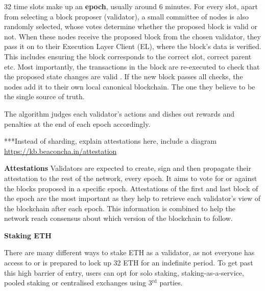 32 time slots make up an \textbf{epoch}, usually around 6 minutes. For every slot, apart from selecting a block proposer (validator), a small committee of nodes is also randomly selected, whose votes determine whether the proposed block is valid or not. When these nodes receive the proposed block from the chosen validator, they pass it on to their Execution Layer Client (EL), where the block's data is verified. This includes ensuring the block corresponds to the correct slot, correct parent etc. Most importantly, the transactions in the block are re-executed to check that the proposed state changes are valid \cite{EthereumEthereum.org}. If the new block passes all checks, the nodes add it to their own local canonical blockchain. The one they believe to be the single source of truth. 

The algorithm judges each validator's actions and dishes out rewards and penalties at the end of each epoch accordingly. 

***Instead of sharding, explain attestations here, include a diagram \url{https://kb.beaconcha.in/attestation}



\textbf{Attestations}
\label{attestationLitRev}
Validators are expected to create, sign and then propagate their attestation to the rest of the network, every epoch. It aims to vote for or against the blocks proposed in a specific epoch. Attestations of the first and last block of the epoch are the most important as they help to retrieve each validator's view of the blockchain after each epoch. This information is combined to help the network reach consensus about which version of the blockchain to follow.
 
\textbf{Staking ETH}

There are many different ways to stake ETH as a validator, as not everyone has access to or is prepared to lock up 32 ETH for an indefinite period. To get past this high barrier of entry, users can opt for solo staking, staking-as-a-service, pooled staking or centralised exchanges using 3$\mathrm{^{rd}}$ parties. 

